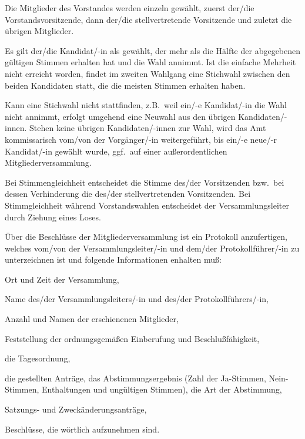 \documentclass[draft]{scrartcl}
\begin{document}
\begin{contract}
Die Mitglieder des Vorstandes werden einzeln gewählt, zuerst der/die
Vorstandsvorsitzende, dann der/die stellvertretende Vorsitzende und zuletzt
die übrigen Mitglieder.

Es gilt der/die Kandidat/-in als gewählt, der mehr als die Hälfte der
abgegebenen gültigen Stimmen erhalten hat und die Wahl annimmt. Ist die
einfache Mehrheit nicht erreicht worden, findet im zweiten Wahlgang eine
Stichwahl zwischen den beiden Kandidaten statt, die die meisten Stimmen
erhalten haben.

Kann eine Stichwahl nicht stattfinden, z.B.\ weil ein/-e Kandidat/-in die Wahl
nicht annimmt, erfolgt umgehend eine Neuwahl aus den übri\-gen
Kandidaten/-innen. Stehen keine übri\-gen Kandidaten/-innen zur Wahl, wird das
Amt kommissarisch vom/von der Vorgänger/-in weitergeführt, bis ein/-e neue/-r
Kandidat/-in gewählt wurde, ggf.\ auf einer außerordentlichen
Mitgliederversammlung.

Bei Stimmengleichheit entscheidet die Stimme des/der Vorsitzenden bzw.\ bei
dessen Verhinderung die des/der stellvertretenden Vorsitzenden. Bei
Stimmgleichheit während Vorstandswahlen entscheidet der Versammlungsleiter
durch Ziehung eines Loses.


Über die Beschlüsse der Mitgliederversammlung ist ein Protokoll anzufertigen,
welches vom/von der Versammlungsleiter/-in und dem/der Protokollführer/-in zu
unterzeichnen ist und folgende Informationen enhalten muß:
\begin{compactenum}[\hspace{2em}1.]
  \item Ort und Zeit der Versammlung,
  \item Name des/der Versammlungsleiters/-in und des/der Protokollführers/-in,
  \item Anzahl und Namen der erschienenen Mitglieder,
  \item Feststellung der ordnungsgemäßen Einberufung und Beschlußfähigkeit,
  \item die Tagesordnung,
  \item die gestellten Anträge, das Abstimmungsergebnis (Zahl der Ja-Stimmen,
    Nein-Stimmen, Enthaltungen und ungültigen Stimmen), die Art der
    Abstimmung,
  \item Satzungs- und Zweckänderungsanträge,
  \item Beschlüsse, die wörtlich aufzunehmen sind.
\end{compactenum}


\end{contract}
\end{document}
